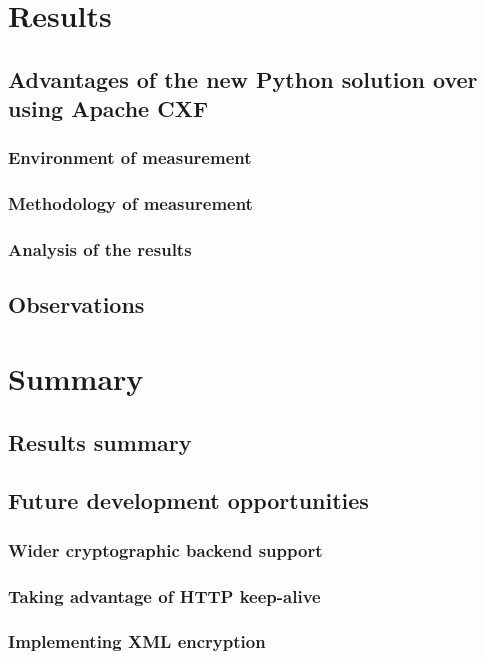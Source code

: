 \chapter{Results}

\section{Advantages of the new Python solution over using Apache CXF}

\subsection{Environment of measurement}

\subsection{Methodology of measurement}

\subsection{Analysis of the results}

\section{Observations}

\chapter{Summary}

\section{Results summary}

\section{Future development opportunities}

\subsection{Wider cryptographic backend support}

\subsection{Taking advantage of HTTP keep-alive}

\subsection{Implementing XML encryption}
